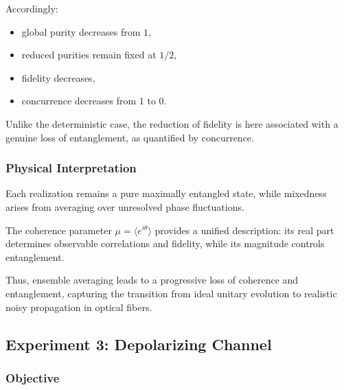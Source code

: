 \documentclass[a4paper]{article}
\begin{document}
Accordingly:
\begin{itemize}
\item global purity decreases from \(1\),
\item reduced purities remain fixed at \(1/2\),
\item fidelity decreases,
\item concurrence decreases from \(1\) to \(0\).
\end{itemize}

Unlike the deterministic case, the reduction of fidelity is here associated with a genuine loss of entanglement, as quantified by concurrence.


\subsubsection{Physical Interpretation}

Each realization remains a pure maximally entangled state, while mixedness arises from averaging over unresolved phase fluctuations.

The coherence parameter \( \mu = \langle e^{i\theta} \rangle \) provides a unified description: its real part determines observable correlations and fidelity, while its magnitude controls entanglement.

Thus, ensemble averaging leads to a progressive loss of coherence and entanglement, capturing the transition from ideal unitary evolution to realistic noisy propagation in optical fibers.



\newpage

\subsection{Experiment 3: Depolarizing Channel}


\subsubsection{Objective}
\end{document}
